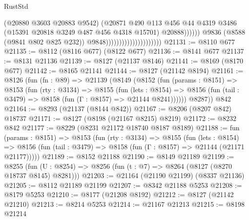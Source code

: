 \begin{lexlean}{RustStd}
\begin{coremodule}
                                                        (@20880 @3603 @20883 @9542)
                                                        (@20871
                                                          @490
                                                          @113
                                                          @456
                                                          @44
                                                          @4319
                                                          @3486
                                                          (@15391
                                                            @20818
                                                            @3249
                                                            @487
                                                            @456
                                                            @4318
                                                            @15701)
                                                          @20888))))))
                                              @9836
                                              (@8588 (@9841 @802 @825 @232))
                                              @9848)))))))))))))))))))))
@21131 := @8110 @677
@21135 := @8112 (@8116 @677) (@8122 @677)
@21136 := @8141 @677
@21137 := @8131 @21136
@21139 := @8127 (@21137 @8146)
@21141 := @8169 (@8170 @677)
@21142 := @8165 @21141
@21144 := @8127 (@21142 @8194)
@21161 := @8126
    (fun (fn : @89) =>
    @21139
      (@8149
        (@8152
          (fun (params : @8151) =>
          @8153
            (fun (rty : @3134) =>
            @8155
              (fun (lets : @8154) =>
              @8156 (fun (tail : @3479) => @8158 (fun (Γ : @8157) => @21144 @8241))))))
        @8287))
    @842
@21164 := @8293 (@21137 (@8144 @842))
@21167 := @8206 (@8207 @842) @18737
@21171 := @8127 (@8198 (@21167 @8215) @8219)
@21172 := @8232 @842
@21177 := @8229 (@8231 @21172 @18740 @8187 @8189)
@21188 := fun (params : @8151) =>
  @8153
    (fun (rty : @3134) =>
    @8155
      (fun (lets : @8154) =>
      @8156 (fun (tail : @3479) => @8158 (fun (Γ : @8157) => @21144 (@21171 @21177)))))
@21189 := @8152 @21188
@21190 := @8149 @21189
@21199 := @8255
    (fun (U : @8254) => @8256 (fun (t : @7) => @8264 (@8127 (@8270 @18737 @8145) @8281)))
@21203 := @21164 (@21190 @21199) (@8337 @21136)
@21205 := @8112 @21189 @21199
@21207 := @8342 @21188 @5253
@21208 := @8179 @5253
@21210 := @8177 (@21208 @8192)
@21212 := @8127 (@21142 @21210)
@21213 := @8214 @5253
@21214 := @21167 @21213
@21215 := @8198 @21214

\end{coremodule}
\end{lexlean}

